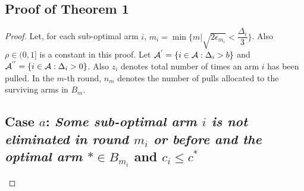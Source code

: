 \subsection{Proof of Theorem 1}
\label{sec:proofTheorem:Theorem1}
\begin{proof}
Let, for each sub-optimal arm ${i}$, $m_{i}=\min{\lbrace m|\sqrt{2\epsilon_{m_i}} < \dfrac{\Delta_{i}}{3} \rbrace}$. Also $\rho\in (0,1]$ is a constant in this proof. Let $\mathcal{A}^{'}=\lbrace i\in \mathcal{A}: \Delta_{i} > b \rbrace$ and $\mathcal{A}^{''}=\lbrace i\in \mathcal{A}: \Delta_{i} > 0 \rbrace$. Also $z_{i}$ denotes total number of times an arm $i$ has been pulled. In the $m$-th round, $n_{m}$ denotes the number of pulls allocated to the surviving arms in $B_{m}$. \\
\subsection*{Case $a$: \textit{Some sub-optimal arm ${i}$ is not eliminated in round $m_{i}$ or before and the optimal arm ${*}\in B_{m_{i}}$} and $c_i \leq c^*$}


\end{proof}
